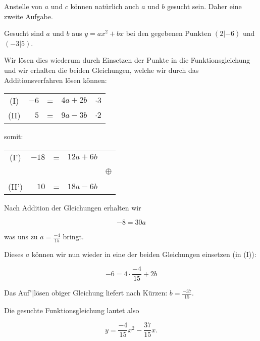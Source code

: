 \begin{beispiel}{}{}
  Anstelle von $a$ und $c$ können natürlich auch $a$ und $b$ gesucht
  sein. Daher eine zweite Aufgabe.

  Gesucht sind $a$ und $b$ aus $y = ax^2 + bx$ bei den gegebenen
\vspace{1mm}
  Punkten $(2|-6)$ und $(-3|5)$.

  \vspace{1mm}

  Wir lösen dies wiederum durch Einsetzen der Punkte in die
  Funktionsgleichung und wir erhalten die beiden Gleichungen, welche
  wir durch das Additionsverfahren lösen können:

  \vspace{2mm}

  \begin{tabular}{c | r  c  r | c}
    (I)  &  $-6$ & = & $4a + 2b$ & $\cdot{} 3$ \\
    (II) &   $5$ & = & $9a - 3b$ & $\cdot{} 2$ \\
  \end{tabular}

  \vspace{2mm}

  somit:

  \vspace{2mm}
  
  \begin{tabular}{c | r  c  r | c}
    (I')  & $-18$ & = & $12a + 6b$ &\, \\
     \,   & \,    & \,&   \,       & $\oplus$\\
    (II') &  $10$ & = & $18a - 6b$ &\, \\
  \end{tabular}
\vspace{1mm}

  Nach Addition der Gleichungen erhalten wir

  $$-8 = 30a$$

  was uns zu $a=\frac{-4}{15}$ bringt.

Dieses $a$ können wir nun wieder in eine der beiden Gleichungen
einsetzen (\zB in (I)):

$$-6=4\cdot{}\frac{-4}{15} + 2b$$

Das Auf"|lösen obiger Gleichung liefert nach Kürzen: $b=\frac{-37}{15}$.

Die gesuchte Funktionsgleichung lautet also

$$y = \frac{-4}{15} x^2 - \frac{37}{15} x.$$

\end{beispiel}

